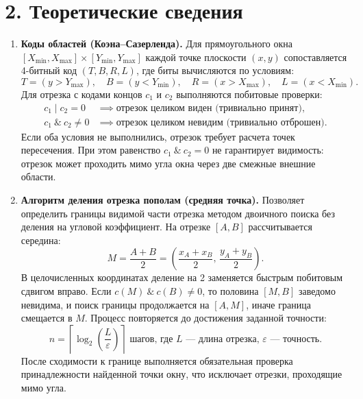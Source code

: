 \documentclass[11pt,a4paper]{article}
\begin{document}
\section*{2. Теоретические сведения}
\begin{enumerate}
    \item \textbf{Коды областей (Коэна--Сазерленда).} Для прямоугольного окна $[X_{\min}, X_{\max}] \times [Y_{\min}, Y_{\max}]$ каждой точке плоскости $(x, y)$ сопоставляется 4-битный код $(T, B, R, L)$, где биты вычисляются по условиям:
    \begin{equation}
        T = (y > Y_{\max}), \quad B = (y < Y_{\min}), \quad R = (x > X_{\max}), \quad L = (x < X_{\min}).
    \end{equation}
    Для отрезка с кодами концов $c_1$ и $c_2$ выполняются побитовые проверки:
    \begin{align}
        c_1 \mid c_2 = 0 &\implies \text{отрезок целиком виден (тривиально принят)}, \\
        c_1 \ \& \ c_2 \neq 0 &\implies \text{отрезок целиком невидим (тривиально отброшен)}.
    \end{align}
    Если оба условия не выполнились, отрезок требует расчета точек пересечения. При этом равенство $c_1 \ \& \ c_2 = 0$ не гарантирует видимость: отрезок может проходить мимо угла окна через две смежные внешние области.

    \item \textbf{Алгоритм деления отрезка пополам (средняя точка).} Позволяет определить границы видимой части отрезка методом двоичного поиска без деления на угловой коэффициент. На отрезке $[A, B]$ рассчитывается середина:
    \begin{equation}
        M = \frac{A + B}{2} = \left(\frac{x_A + x_B}{2}, \, \frac{y_A + y_B}{2}\right).
    \end{equation}
    В целочисленных координатах деление на 2 заменяется быстрым побитовым сдвигом вправо. Если $c(M) \ \& \ c(B) \neq 0$, то половина $[M, B]$ заведомо невидима, и поиск границы продолжается на $[A, M]$, иначе граница смещается в $M$. Процесс повторяется до достижения заданной точности:
    \begin{equation}
        n = \left\lceil \log_2 \left(\frac{L}{\varepsilon}\right) \right\rceil \text{ шагов, где } L \text{ --- длина отрезка, } \varepsilon \text{ --- точность.}
    \end{equation}
    После сходимости к границе выполняется обязательная проверка принадлежности найденной точки окну, что исключает отрезки, проходящие мимо угла.


\end{enumerate}
\end{document}
